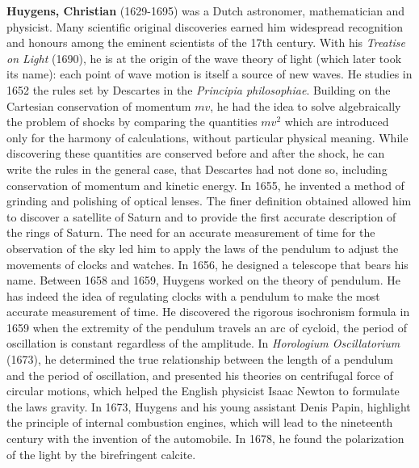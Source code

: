 \textbf{Huygens, Christian} (1629-1695) was a Dutch astronomer, mathematician and physicist. Many scientific original discoveries earned him widespread recognition and honours among the eminent scientists of the 17th century. With his \textit{Treatise on Light} (1690), he is at the origin of the wave theory of light (which later took its name): each point of wave motion is itself a source of new waves. He studies in 1652 the rules set by Descartes in the \textit{ Principia philosophiae}. Building on the Cartesian conservation of momentum $mv$, he had the idea to solve algebraically the problem of shocks by comparing the quantities $mv^2$ which are introduced only for the harmony of calculations, without particular physical meaning. While discovering these quantities are conserved before and after the shock, he can write the rules in the general case, that Descartes had not done so, including conservation of momentum and kinetic energy. In 1655, he invented a method of grinding and polishing of optical lenses. The finer definition obtained allowed him to discover a satellite of Saturn and to provide the first accurate description of the rings of Saturn. The need for an accurate measurement of time for the observation of the sky led him to apply the laws of the pendulum to adjust the movements of clocks and watches. In 1656, he designed a telescope that bears his name. Between 1658 and 1659, Huygens worked on the theory of pendulum. He has indeed the idea of regulating clocks with a pendulum to make the most accurate measurement of time. He discovered the rigorous isochronism formula in 1659 when the extremity of the pendulum travels an arc of cycloid, the period of oscillation is constant regardless of the amplitude. In \textit{Horologium Oscillatorium} (1673), he determined the true relationship between the length of a pendulum and the period of oscillation, and presented his theories on centrifugal force of circular motions, which helped the English physicist Isaac Newton to formulate the laws gravity. In 1673, Huygens and his young assistant Denis Papin, highlight the principle of internal combustion engines, which will lead to the nineteenth century with the invention of the automobile. In 1678, he found the polarization of the light by the birefringent calcite.

{}


